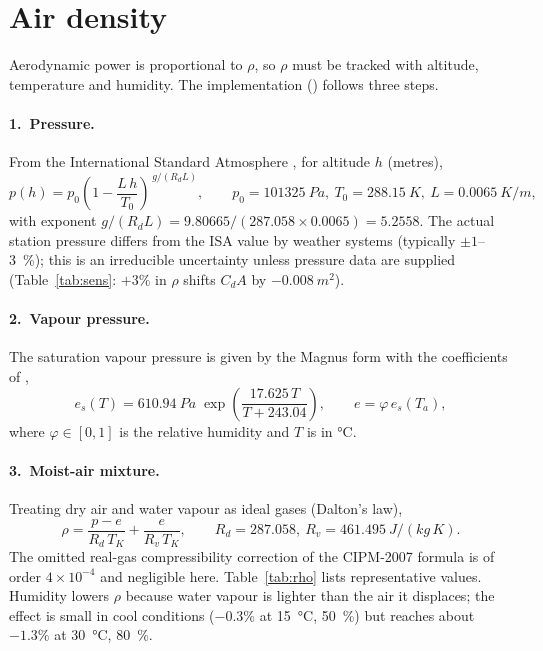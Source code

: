 \documentclass[11pt,a4paper]{article}
\newcommand{\code}[1]{\texttt{\detokenize{#1}}}
\newcommand{\CdA}{C_{\!d}A}
\begin{document}
\section{Air density}
\label{sec:density}
Aerodynamic power is proportional to \(\rho\), so \(\rho\) must be tracked with altitude, temperature and humidity. The implementation (\code{get_air_density}) follows three steps.

\paragraph{1.\ Pressure.} From the International Standard Atmosphere \citep{iso2533}, for altitude \(h\) (metres),
\begin{equation}
 p(h) = p_0\left(1-\frac{L\,h}{T_0}\right)^{\,g/(R_d L)},\qquad p_0=\SI{101325}{Pa},\ T_0=\SI{288.15}{K},\ L=\SI{0.0065}{K/m},
\end{equation}
with exponent \(g/(R_dL)=9.80665/(287.058\times0.0065)=5.2558\). The actual station pressure differs from the ISA value by weather systems (typically \(\pm1\)--\SI{3}{\percent}); this is an irreducible uncertainty unless pressure data are supplied (Table~\ref{tab:sens}: \(+3\%\) in \(\rho\) shifts \(\CdA\) by \(-0.008\ \si{m^2}\)).

\paragraph{2.\ Vapour pressure.} The saturation vapour pressure is given by the Magnus form with the coefficients of \citet{alduchov1996},
\begin{equation}
 e_s(T)=\SI{610.94}{Pa}\;\exp\!\left(\frac{17.625\,T}{T+243.04}\right),\qquad e=\varphi\,e_s(T_a),
\end{equation}
where \(\varphi\in[0,1]\) is the relative humidity and \(T\) is in \si{\degreeCelsius}.

\paragraph{3.\ Moist-air mixture.} Treating dry air and water vapour as ideal gases (Dalton's law),
\begin{equation}
 \rho=\frac{p-e}{R_d\,T_K}+\frac{e}{R_v\,T_K},\qquad R_d=287.058,\ R_v=\SI{461.495}{J/(kg\,K)}.
\end{equation}
The omitted real-gas compressibility correction of the CIPM-2007 formula \citep{picard2008} is of order \(4\times10^{-4}\) and negligible here. Table~\ref{tab:rho} lists representative values. Humidity lowers \(\rho\) because water vapour is lighter than the air it displaces; the effect is small in cool conditions (\(-0.3\%\) at \SI{15}{\degreeCelsius}, \SI{50}{\percent}) but reaches about \(-1.3\%\) at \SI{30}{\degreeCelsius}, \SI{80}{\percent}.
\end{document}
